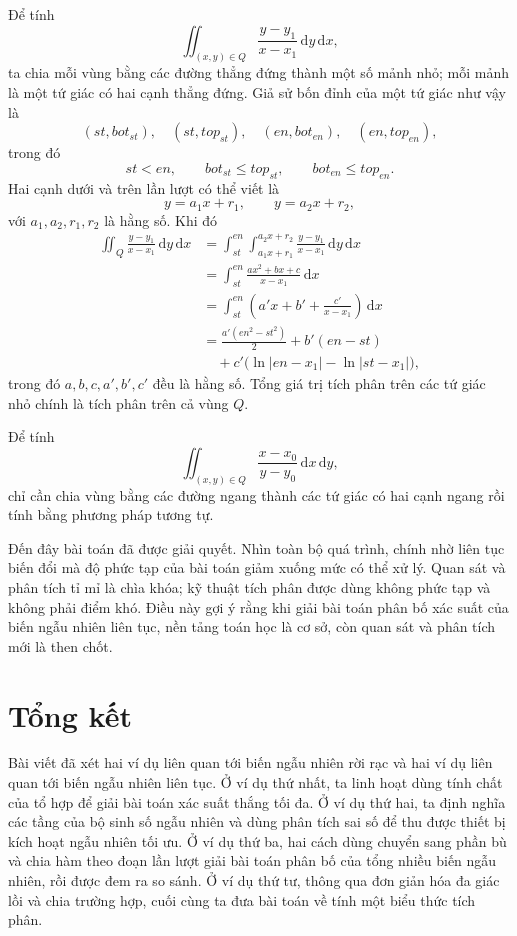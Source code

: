 \documentclass[11pt]{article}
\newcommand{\dd}{\,\mathrm{d}}
\begin{document}
Để tính
\[
  \iint_{(x,y)\in Q}\frac{y-y_1}{x-x_1}\dd y\dd x,
\]
ta chia mỗi vùng bằng các đường thẳng đứng thành một số mảnh nhỏ; mỗi mảnh là
một tứ giác có hai cạnh thẳng đứng. Giả sử bốn đỉnh của một tứ giác như vậy là
\[
  (\mathit{st},\mathit{bot}_{st}),\quad
  (\mathit{st},\mathit{top}_{st}),\quad
  (\mathit{en},\mathit{bot}_{en}),\quad
  (\mathit{en},\mathit{top}_{en}),
\]
trong đó
\[
  \mathit{st}<\mathit{en},\qquad
  \mathit{bot}_{st}\le \mathit{top}_{st},\qquad
  \mathit{bot}_{en}\le \mathit{top}_{en}.
\]
Hai cạnh dưới và trên lần lượt có thể viết là
\[
  y=a_1x+r_1,\qquad y=a_2x+r_2,
\]
với \(a_1,a_2,r_1,r_2\) là hằng số. Khi đó
\[
\begin{aligned}
\iint_Q\frac{y-y_1}{x-x_1}\dd y\dd x
&=
\int_{\mathit{st}}^{\mathit{en}}
\int_{a_1x+r_1}^{a_2x+r_2}
\frac{y-y_1}{x-x_1}\dd y\dd x\\
&=
\int_{\mathit{st}}^{\mathit{en}}
\frac{ax^2+bx+c}{x-x_1}\dd x\\
&=
\int_{\mathit{st}}^{\mathit{en}}
\left(a'x+b'+\frac{c'}{x-x_1}\right)\dd x\\
&=
\frac{a'(\mathit{en}^2-\mathit{st}^2)}{2}
+b'(\mathit{en}-\mathit{st})\\
&\quad
+c'\bigl(\ln|\mathit{en}-x_1|-\ln|\mathit{st}-x_1|\bigr),
\end{aligned}
\]
trong đó \(a,b,c,a',b',c'\) đều là hằng số. Tổng giá trị tích phân trên các tứ
giác nhỏ chính là tích phân trên cả vùng \(Q\).

Để tính
\[
  \iint_{(x,y)\in Q}\frac{x-x_0}{y-y_0}\dd x\dd y,
\]
chỉ cần chia vùng bằng các đường ngang thành các tứ giác có hai cạnh ngang rồi
tính bằng phương pháp tương tự.

Đến đây bài toán đã được giải quyết. Nhìn toàn bộ quá trình, chính nhờ liên
tục biến đổi mà độ phức tạp của bài toán giảm xuống mức có thể xử lý. Quan
sát và phân tích tỉ mỉ là chìa khóa; kỹ thuật tích phân được dùng không phức
tạp và không phải điểm khó. Điều này gợi ý rằng khi giải bài toán phân bố xác
suất của biến ngẫu nhiên liên tục, nền tảng toán học là cơ sở, còn quan sát và
phân tích mới là then chốt.

\section{Tổng kết}

Bài viết đã xét hai ví dụ liên quan tới biến ngẫu nhiên rời rạc và hai ví dụ
liên quan tới biến ngẫu nhiên liên tục. Ở ví dụ thứ nhất, ta linh hoạt dùng
tính chất của tổ hợp để giải bài toán xác suất thắng tối đa. Ở ví dụ thứ hai,
ta định nghĩa các tầng của bộ sinh số ngẫu nhiên và dùng phân tích sai số để
thu được thiết bị kích hoạt ngẫu nhiên tối ưu. Ở ví dụ thứ ba, hai cách dùng
chuyển sang phần bù và chia hàm theo đoạn lần lượt giải bài toán phân bố của
tổng nhiều biến ngẫu nhiên, rồi được đem ra so sánh. Ở ví dụ thứ tư, thông
qua đơn giản hóa đa giác lồi và chia trường hợp, cuối cùng ta đưa bài toán về
tính một biểu thức tích phân.
\end{document}
